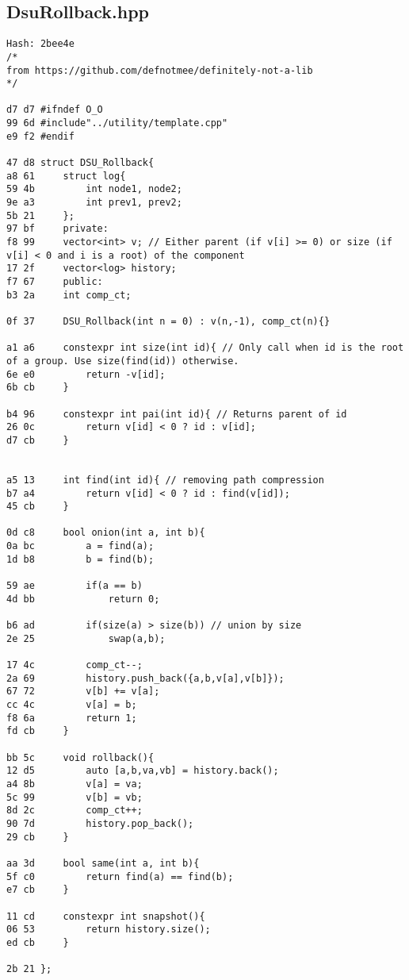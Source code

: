 \documentclass[11pt, a4paper, twoside]{article}
\begin{document}
\subsection{DsuRollback.hpp}
\begin{lstlisting}
Hash: 2bee4e
/*
from https://github.com/defnotmee/definitely-not-a-lib
*/

d7 d7 #ifndef O_O
99 6d #include"../utility/template.cpp"
e9 f2 #endif

47 d8 struct DSU_Rollback{
a8 61     struct log{
59 4b         int node1, node2;
9e a3         int prev1, prev2;
5b 21     };
97 bf     private:
f8 99     vector<int> v; // Either parent (if v[i] >= 0) or size (if v[i] < 0 and i is a root) of the component
17 2f     vector<log> history;
f7 67     public:
b3 2a     int comp_ct;
          
0f 37     DSU_Rollback(int n = 0) : v(n,-1), comp_ct(n){}
      
a1 a6     constexpr int size(int id){ // Only call when id is the root of a group. Use size(find(id)) otherwise.
6e e0         return -v[id];
6b cb     }
      
b4 96     constexpr int pai(int id){ // Returns parent of id
26 0c         return v[id] < 0 ? id : v[id];
d7 cb     }
      
      
a5 13     int find(int id){ // removing path compression
b7 a4         return v[id] < 0 ? id : find(v[id]);
45 cb     }
      
0d c8     bool onion(int a, int b){
0a bc         a = find(a);
1d b8         b = find(b);
      
59 ae         if(a == b)
4d bb             return 0;
      
b6 ad         if(size(a) > size(b)) // union by size
2e 25             swap(a,b);
      
17 4c         comp_ct--;
2a 69         history.push_back({a,b,v[a],v[b]});
67 72         v[b] += v[a];
cc 4c         v[a] = b;
f8 6a         return 1;
fd cb     }
      
bb 5c     void rollback(){
12 d5         auto [a,b,va,vb] = history.back();
a4 8b         v[a] = va;
5c 99         v[b] = vb;
8d 2c         comp_ct++;
90 7d         history.pop_back();
29 cb     }
      
aa 3d     bool same(int a, int b){
5f c0         return find(a) == find(b);
e7 cb     }
      
11 cd     constexpr int snapshot(){
06 53         return history.size();
ed cb     }
          
2b 21 };
\end{lstlisting}
\end{document}
